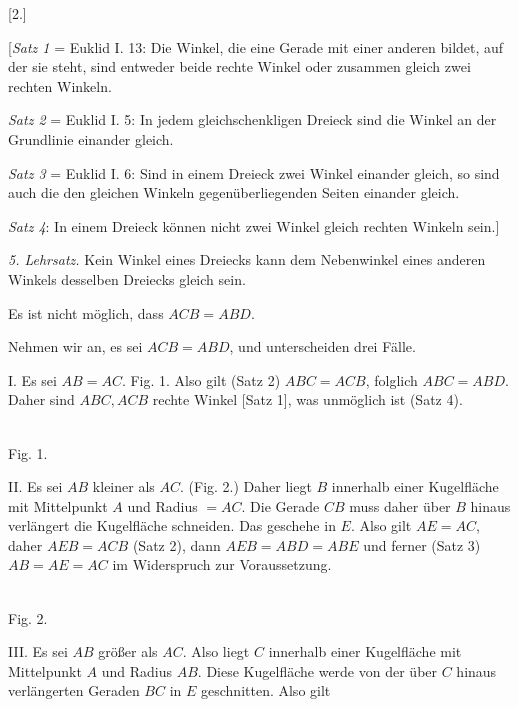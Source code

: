 \begin{center}[2.]\end{center}


[\emph{Satz 1} = Euklid I. 13: Die Winkel, die eine Gerade mit einer anderen bildet,
auf der sie steht, sind entweder beide rechte Winkel oder zusammen gleich
zwei rechten Winkeln.

\emph{Satz 2} = Euklid I. 5: In jedem gleichschenkligen Dreieck sind die
Winkel an der Grundlinie einander gleich.

\emph{Satz 3} = Euklid I. 6: Sind in einem Dreieck zwei Winkel einander
gleich, so sind auch die den gleichen Winkeln gegenüberliegenden Seiten einander gleich.

\emph{Satz 4}: In einem Dreieck können nicht zwei Winkel gleich rechten Winkeln
sein.]

\emph{5. Lehrsatz.} Kein Winkel eines Dreiecks kann dem Nebenwinkel eines
anderen Winkels desselben Dreiecks gleich sein.

Es ist nicht möglich, dass $ACB = ABD$.

 Nehmen wir an, es sei $ACB = ABD$, und unterscheiden drei
Fälle.

I. Es sei $AB = AC$. Fig. 1. Also gilt (Satz 2) $ABC = ACB$, folglich
$ABC = ABD$. Daher sind $ABC, ACB$ rechte Winkel [Satz 1], was
unmöglich ist (Satz 4).



\begin{center}
\\[3pt]Fig. 1.
\end{center}

II. Es sei $AB$ kleiner als $AC$. (Fig. 2.) Daher liegt $B$ innerhalb
einer Kugelfläche mit Mittelpunkt $A$ und Radius $=AC$. Die Gerade
$CB$ muss daher über $B$ hinaus verlängert die Kugelfläche schneiden. Das
geschehe in $E$. Also gilt $AE=AC$, daher $AEB=ACB$ (Satz 2), dann
$AEB=ABD=ABE$ und ferner (Satz 3) $AB=AE=AC$ im Widerspruch zur Voraussetzung.



\begin{center}
\\[3pt]Fig. 2.
\end{center}

III. Es sei $AB$ größer als $AC$. Also liegt $C$ innerhalb einer
Kugelfläche mit Mittelpunkt $A$ und Radius $AB$. Diese Kugelfläche werde von der
über $C$ hinaus verlängerten Geraden $BC$ in $E$ geschnitten. Also gilt
